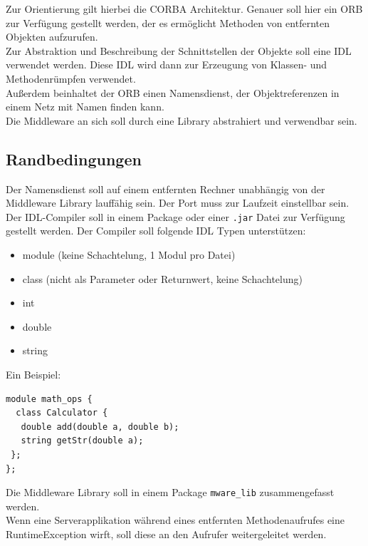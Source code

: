 \documentclass{article}
\begin{document}
Zur Orientierung gilt hierbei die CORBA Architektur. Genauer soll hier ein ORB zur
Verfügung gestellt werden, der es ermöglicht Methoden von entfernten Objekten aufzurufen.\\

Zur Abstraktion und Beschreibung der Schnittstellen der Objekte soll eine IDL verwendet werden.
Diese IDL wird dann zur Erzeugung von Klassen- und Methodenrümpfen verwendet.\\

Außerdem beinhaltet der ORB einen Namensdienst, der Objektreferenzen in einem Netz mit Namen finden
kann.\\

Die Middleware an sich soll durch eine Library abstrahiert und verwendbar sein.

\subsection{Randbedingungen}
Der Namensdienst soll auf einem entfernten Rechner unabhängig von der Middleware Library
lauffähig sein. Der Port muss zur Laufzeit einstellbar sein.\\

Der IDL-Compiler soll in einem Package oder einer \texttt{.jar} Datei zur Verfügung gestellt
werden. Der Compiler soll folgende IDL Typen unterstützen:

\begin{itemize}
    \item module (keine Schachtelung, 1 Modul pro Datei)
    \item class (nicht als Parameter oder Returnwert, keine Schachtelung)
    \item int
    \item double
    \item string
\end{itemize}

Ein Beispiel:
\begin{lstlisting}
module math_ops {
  class Calculator {
   double add(double a, double b);
   string getStr(double a);
 };
};
\end{lstlisting}

Die Middleware Library soll in einem Package \texttt{mware\_lib} zusammengefasst werden.\\

Wenn eine Serverapplikation während eines entfernten Methodenaufrufes eine RuntimeException
wirft, soll diese an den Aufrufer weitergeleitet werden.\\
\end{document}
